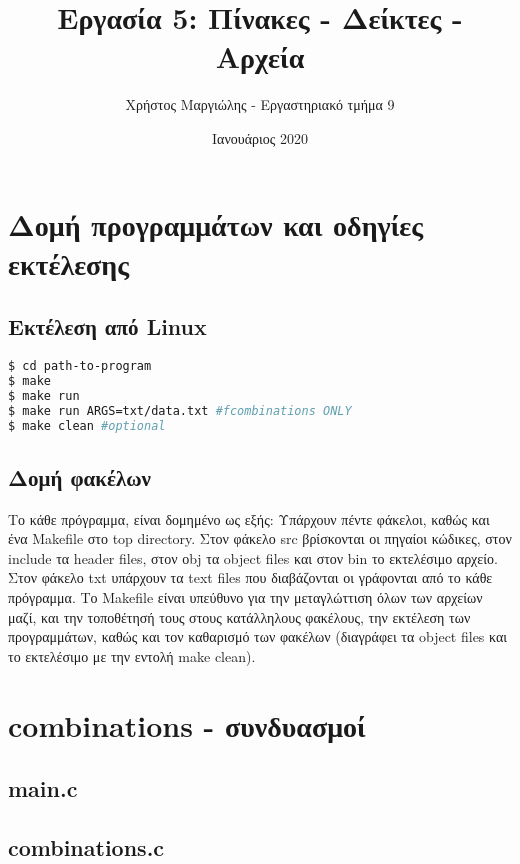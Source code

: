 \documentclass{article}
\title{Εργασία 5: Πίνακες - Δείκτες - Αρχεία}
\author{Χρήστος Μαργιώλης - Εργαστηριακό τμήμα 9}
\date{Ιανουάριος 2020}
\begin{document}
\begin{titlepage}
    \maketitle
\end{titlepage}

\renewcommand{\contentsname}{Περιεχόμενα}
\tableofcontents

\section{Δομή προγραμμάτων και οδηγίες εκτέλεσης}

    \subsection{Εκτέλεση από Linux}
\begin{lstlisting}[language=bash]
$ cd path-to-program
$ make
$ make run
$ make run ARGS=txt/data.txt #fcombinations ONLY
$ make clean #optional
\end{lstlisting}

    \subsection{Δομή φακέλων}

    Το κάθε πρόγραμμα, είναι δομημένο ως εξής: Υπάρχουν πέντε φάκελοι, καθώς και ένα Makefile
    στο top directory. Στον φάκελο src βρίσκονται οι πηγαίοι κώδικες, στον include τα header
    files, στον οbj τα object files και στον bin το εκτελέσιμο αρχείο. Στον φάκελο txt
    υπάρχουν τα text files που διαβάζονται οι γράφονται από το κάθε πρόγραμμα.
    Το Makefile είναι υπεύθυνο για την μεταγλώττιση όλων των αρχείων μαζί, και την τοποθέτησή
    τους στους κατάλληλους φακέλους, την εκτέλεση των προγραμμάτων, καθώς και τον καθαρισμό των
    φακέλων (διαγράφει τα object files και το εκτελέσιμο με την εντολή make clean).

\section{combinations - συνδυασμοί}

    \subsection{main.c}
        

    \subsection{combinations.c}
        
\end{document}
